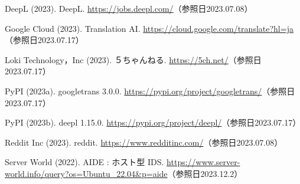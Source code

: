 \documentclass[b5paper,12pt,dvipdfmx]{jsreport}
\begin{document}
\begin{thebibliography}{99}
DeepL (2023). DeepL. \url{https://jobs.deepl.com/}（参照日2023.07.08）

Google Cloud (2023). Translation AI. \url{https://cloud.google.com/translate?hl=ja}（参照日2023.07.17）

Loki Technology，Inc (2023). ５ちゃんねる. \url{https://5ch.net/}（参照日2023.07.17）

PyPI (2023a). googletrans 3.0.0. \url{https://pypi.org/project/googletrans/}（参照日2023.07.17）

PyPI (2023b). deepl 1.15.0. \url{https://pypi.org/project/deepl/}（参照日2023.07.17）

Reddit Inc (2023). reddit. \url{https://www.redditinc.com/}（参照日2023.07.08）

Server World (2022). AIDE : ホスト型 IDS. \url{https://www.server-world.info/query?os=Ubuntu_22.04&p=aide}（参照日2023.12.2）


\end{thebibliography}
    
\end{document}
